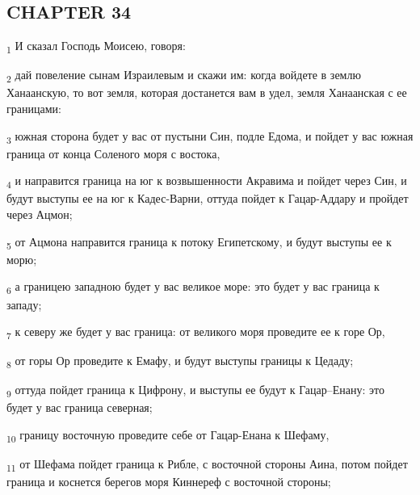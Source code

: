 \subsection{CHAPTER 34}
\begin{tcolorbox}
\textsubscript{1} И сказал Господь Моисею, говоря:
\end{tcolorbox}
\begin{tcolorbox}
\textsubscript{2} дай повеление сынам Израилевым и скажи им: когда войдете в землю Ханаанскую, то вот земля, которая достанется вам в удел, земля Ханаанская с ее границами:
\end{tcolorbox}
\begin{tcolorbox}
\textsubscript{3} южная сторона будет у вас от пустыни Син, подле Едома, и пойдет у вас южная граница от конца Соленого моря с востока,
\end{tcolorbox}
\begin{tcolorbox}
\textsubscript{4} и направится граница на юг к возвышенности Акравима и пойдет через Син, и будут выступы ее на юг к Кадес-Варни, оттуда пойдет к Гацар-Аддару и пройдет через Ацмон;
\end{tcolorbox}
\begin{tcolorbox}
\textsubscript{5} от Ацмона направится граница к потоку Египетскому, и будут выступы ее к морю;
\end{tcolorbox}
\begin{tcolorbox}
\textsubscript{6} а границею западною будет у вас великое море: это будет у вас граница к западу;
\end{tcolorbox}
\begin{tcolorbox}
\textsubscript{7} к северу же будет у вас граница: от великого моря проведите ее к горе Ор,
\end{tcolorbox}
\begin{tcolorbox}
\textsubscript{8} от горы Ор проведите к Емафу, и будут выступы границы к Цедаду;
\end{tcolorbox}
\begin{tcolorbox}
\textsubscript{9} оттуда пойдет граница к Цифрону, и выступы ее будут к Гацар--Енану: это будет у вас граница северная;
\end{tcolorbox}
\begin{tcolorbox}
\textsubscript{10} границу восточную проведите себе от Гацар-Енана к Шефаму,
\end{tcolorbox}
\begin{tcolorbox}
\textsubscript{11} от Шефама пойдет граница к Рибле, с восточной стороны Аина, потом пойдет граница и коснется берегов моря Киннереф с восточной стороны;
\end{tcolorbox}
